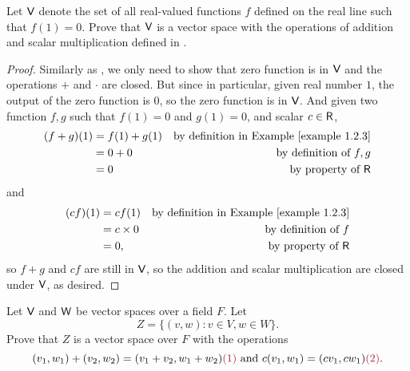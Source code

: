 \begin{exercise} \label{exercise 1.2.20}
Let \(\textsf{V}\) denote the set of all real-valued functions \(f\) defined on the real line such that \(f(1) = 0\).
Prove that \(\textsf{V}\) is a vector space with the operations
of addition and scalar multiplication defined in .
\end{exercise}

\begin{proof}
Similarly as , we only need to show that zero function is in \(\textsf{V}\) and the operations \(+\) and \(\cdot\) are closed.
But since in particular, given real number \(1\), the output of the zero function is \(0\), so the zero function is in \(\textsf{V}\).
And given two function \(f, g\) such that \(f(1) = 0\) and \(g(1) = 0\), and scalar \(c \in \textsf{R}\),
\begin{align*}
    (f + g)(1) & = f(1) + g(1) & \text{by definition in \EXAMPLE{1.2.3}} \\
               & = 0 + 0 & \text{by definition of \(f, g\)} \\
               & = 0 & \text{by property of \(\SET{R}\)}
\end{align*}
and
\begin{align*}
    (cf)(1) & = cf(1) & \text{by definition in \EXAMPLE{1.2.3}} \\
            & = c \X 0 & \text{by definition of \(f\)} \\
            & = 0, & \text{by property of \(\SET{R}\)}
\end{align*}
so \(f + g\) and \(cf\) are still in \(\textsf{V}\), so the addition and scalar multiplication are closed under \(\textsf{V}\), as desired.
\end{proof}

\begin{exercise} \label{exercise 1.2.21}
Let \(\textsf{V}\) and \(\textsf{W}\) be vector spaces over a field \(F\).
Let
\[
    Z = \{ (v, w) : v \in V, w \in W \}.
\]
Prove that \(Z\) is a vector space over \(F\) with the operations
\[
    (v_1, w_1) + (v_2, w_2) = (v_1 + v_2, w_1 + w_2) \MAROON{(1)} \text{ and } c(v_1, w_1) = (c v_1, c w_1) \MAROON{(2)}.
\]
\end{exercise}

